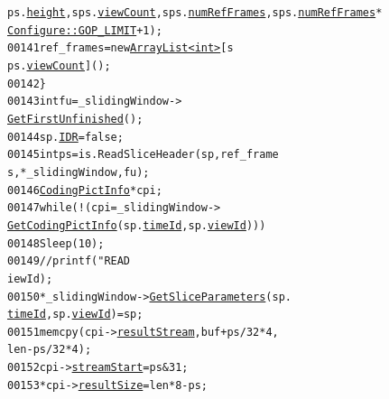 \begin{footnotesize}
\begin{alltt}
      ps.\hyperlink{struct_sequence_parameters_set_ab3b7bd818f9a0d1456d92496473a42eb}{height}, sps.\hyperlink{struct_sequence_parameters_set_af32c7819f630856ccd99aaf78e8f656c}{viewCount}, sps.\hyperlink{struct_sequence_parameters_set_a8404973d25f8601dd012299638361f03}{numRefFrames}, sps.\hyperlink{struct_sequence_parameters_set_a8404973d25f8601dd012299638361f03}{numRefFrames} * 
      \hyperlink{class_configure_a0a595a8bf2825d2238fa77b2ecff2c5a}{Configure::GOP_LIMIT} + 1);
00141                                                 ref\_frames = \textcolor{keyword}{new} \hyperlink{class_array_list}{ArrayList<int>}[s
      ps.\hyperlink{struct_sequence_parameters_set_af32c7819f630856ccd99aaf78e8f656c}{viewCount}]();
00142                                         \}
00143                                         \textcolor{keywordtype}{int} fu = \_slidingWindow->
      \hyperlink{class_sliding_window_a3be69abc76bff5b71ab96dadcced9f65}{GetFirstUnfinished}();
00144                                         sp.\hyperlink{struct_slice_parameters_a60f8fe21acd611ec6892e47a2c6029e3}{IDR} = \textcolor{keyword}{false};
00145                                         \textcolor{keywordtype}{int} ps = is.ReadSliceHeader(sp, ref\_frame
      s, *\_slidingWindow, fu);
00146                                         \hyperlink{struct_coding_pict_info}{CodingPictInfo} *cpi;
00147                                         \textcolor{keywordflow}{while} (!(cpi = \_slidingWindow->
      \hyperlink{class_sliding_window_ac50874323a2aaa4ef76fab47f80c9f92}{GetCodingPictInfo}(sp.\hyperlink{struct_slice_parameters_ad6a26fe2f228235e4f0c31c336cf5e12}{timeId}, sp.\hyperlink{struct_slice_parameters_ae570f1ba10b1e091c7519264534a7143}{viewId})))
00148                                                 Sleep(10);
00149                                         \textcolor{comment}{//printf("READ %
      iewId);}
00150                                         *\_slidingWindow->\hyperlink{class_sliding_window_a020d2c25f1bda31337f91bf9b1a809d1}{GetSliceParameters}(sp.
      \hyperlink{struct_slice_parameters_ad6a26fe2f228235e4f0c31c336cf5e12}{timeId}, sp.\hyperlink{struct_slice_parameters_ae570f1ba10b1e091c7519264534a7143}{viewId}) = sp;
00151                                         memcpy(cpi->\hyperlink{struct_coding_pict_info_af53de7a35b8796df845ddee01d70fc5b}{resultStream}, buf + ps/32*4, 
      len-ps/32*4);
00152                                         cpi->\hyperlink{struct_coding_pict_info_a589da1ebbfa6493b63005412ce79dac6}{streamStart} = ps & 31;
00153                                         *cpi->\hyperlink{struct_coding_pict_info_a37155b7c53db0a4a94d314bdc3c95104}{resultSize} = len * 8 - ps;

\end{alltt}
\end{footnotesize}
